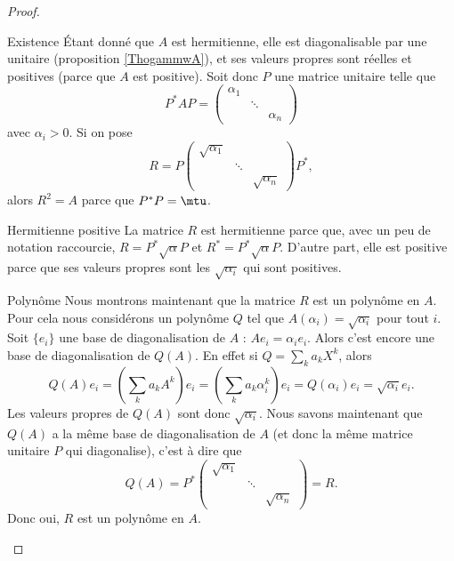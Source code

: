 \begin{proof}
    \begin{subproof}
    \item[Existence]
        Étant donné que \( A \) est hermitienne, elle est diagonalisable par une unitaire (proposition \ref{ThogammwA}), et ses valeurs propres sont réelles et positives (parce que \( A\) est positive). Soit donc \( P\) une matrice unitaire telle que
        \begin{equation}
            P^*AP=\begin{pmatrix}
                \alpha_1    &       &       \\
                    &   \ddots    &       \\
                    &       &   \alpha_n
            \end{pmatrix}
        \end{equation}
        avec \( \alpha_i>0\). Si on pose
        \begin{equation}
            R=P\begin{pmatrix}
                \sqrt{\alpha_1}    &       &       \\
                    &   \ddots    &       \\
                    &       &   \sqrt{\alpha_n}
            \end{pmatrix}P^*,
        \end{equation}
        alors \( R^2=A\) parce que \( P^*P=\mtu\).
    \item[Hermitienne positive]
        La matrice \( R\) est hermitienne parce que, avec un peu de notation raccourcie, \( R=P^*\sqrt{\alpha}P\) et \( R^*=P^*\sqrt{\alpha}P\). D'autre part, elle est positive parce que ses valeurs propres sont les \( \sqrt{\alpha_i}\) qui sont positives.
        
    \item[Polynôme]
        Nous montrons maintenant que la matrice \( R\) est un polynôme en \( A\). Pour cela nous considérons un polynôme \( Q\) tel que \( A(\alpha_i)=\sqrt{\alpha_i}\) pour tout \( i\). Soit \( \{ e_i \}\) une base de diagonalisation de \( A\) : \( Ae_i=\alpha_ie_i\). Alors c'est encore une base de diagonalisation de \( Q(A)\). En effet si \( Q=\sum_ka_kX^k\), alors
        \begin{equation}
            Q(A)e_i=(\sum_ka_kA^k)e_i=(\sum_ka_k\alpha_i^k)e_i=Q(\alpha_i)e_i=\sqrt{\alpha_i}e_i.
        \end{equation}
        Les valeurs propres de \( Q(A)\) sont donc \( \sqrt{\alpha_i}\). Nous savons maintenant que \( Q(A)\) a la même base de diagonalisation de \( A\) (et donc la même matrice unitaire \( P\) qui diagonalise), c'est à dire que
        \begin{equation}
            Q(A)=P^*\begin{pmatrix}
                \sqrt{\alpha_1}    &       &       \\
                    &   \ddots    &       \\
                    &       &   \sqrt{\alpha_n}
            \end{pmatrix}=R.
        \end{equation}
        Donc oui, \( R\) est un polynôme en \( A\).


\end{subproof}
\end{proof}
